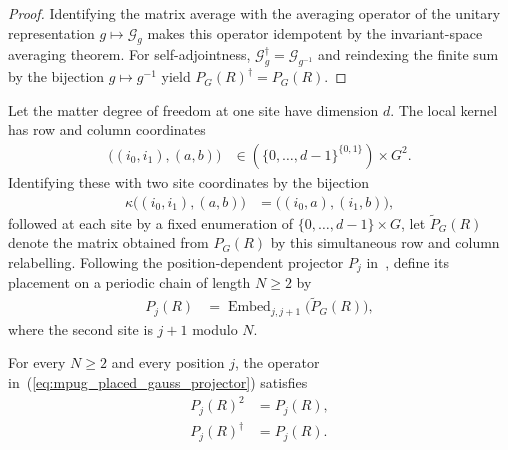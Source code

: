 \begin{proof}\leanok
    Identifying the matrix average with the averaging operator of the unitary
    representation $g\mapsto\mathcal G_g$ makes this operator idempotent by
    the invariant-space averaging theorem. For self-adjointness,
    $\mathcal G_g^\dagger=\mathcal G_{g^{-1}}$ and reindexing the finite sum by
    the bijection $g\mapsto g^{-1}$ yield $P_G(R)^\dagger=P_G(R)$.
\end{proof}

\begin{definition}
    \label{def:mpug_placed_gauss_projector}
    \leanok
    Let the matter degree of freedom at one site have dimension $d$.  The
    local kernel has row and column coordinates
    \begin{align}
        \bigl((i_0,i_1),(a,b)\bigr)
         & \in (\{0,\ldots,d-1\}^{\{0,1\}})\times G^2.
    \end{align}
    Identifying these with two site coordinates by the bijection
    \begin{align}
        \kappa\bigl((i_0,i_1),(a,b)\bigr)
         & =\bigl((i_0,a),(i_1,b)\bigr),
    \end{align}
    followed at each site by a fixed enumeration of
    $\{0,\ldots,d-1\}\times G$, let $\widetilde P_G(R)$ denote the matrix
    obtained from $P_G(R)$ by this simultaneous row and column relabelling.
    Following the position-dependent projector $P_j$
    in~\cite[lines~3494--3499]{FrancoRubio2025MPUGauging}, define its placement
    on a periodic chain of length $N\geq2$ by
    \begin{align}
        P_j(R) & =\operatorname{Embed}_{j,j+1}\bigl(\widetilde P_G(R)\bigr),
        \label{eq:mpug_placed_gauss_projector}
    \end{align}
    where the second site is $j+1$ modulo $N$.
\end{definition}

\begin{lemma}
    \label{thm:mpug_placed_gauss_projector_projection}
    \leanok
    For every $N\geq2$ and every position $j$, the operator
    in~(\ref{eq:mpug_placed_gauss_projector}) satisfies
    \begin{align}
        P_j(R)^2       & =P_j(R), \\
        P_j(R)^\dagger & =P_j(R).
    \end{align}
\end{lemma}

